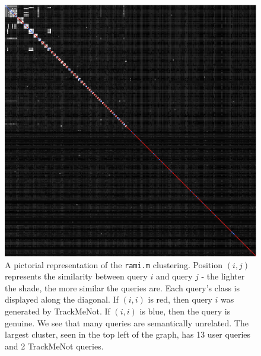 \documentclass[11pt]{article}
\begin{document}
\begin{multicols}{2}
  \begin{figure}[h]
    \centering
    \includegraphics[width=\linewidth]{disco_rami_305.png}
    \caption{A pictorial representation of the \texttt{rami.m}
      clustering. Position $(i,j)$ represents the similarity between
      query $i$ and query $j$ - the lighter the shade, the more
      similar the queries are. Each query's class is displayed along the
      diagonal. If $(i,i)$ is red, then query $i$ was generated by
      TrackMeNot. If $(i,i)$ is blue, then the query is genuine. We
      see that many queries are semantically unrelated. The largest
      cluster, seen in the top left of the graph, has 13 user queries and 2 TrackMeNot queries.}
    \label{fig:disco.rami}
  \end{figure}



\end{multicols}
\end{document}

